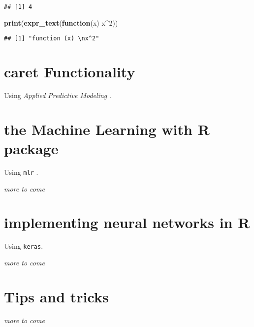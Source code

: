 \documentclass[]{book}
\newenvironment{Shaded}{\begin{snugshade}}{\end{snugshade}}
\newcommand{\KeywordTok}[1]{\textcolor[rgb]{0.13,0.29,0.53}{\textbf{#1}}}
\newcommand{\DecValTok}[1]{\textcolor[rgb]{0.00,0.00,0.81}{#1}}
\newcommand{\ControlFlowTok}[1]{\textcolor[rgb]{0.13,0.29,0.53}{\textbf{#1}}}
\newcommand{\OperatorTok}[1]{\textcolor[rgb]{0.81,0.36,0.00}{\textbf{#1}}}
\newcommand{\NormalTok}[1]{#1}
\begin{document}
\begin{verbatim}
## [1] 4
\end{verbatim}

\begin{Shaded}
\begin{Highlighting}[]
\KeywordTok{print}\NormalTok{(}\KeywordTok{expr_text}\NormalTok{(}\ControlFlowTok{function}\NormalTok{(x) x}\OperatorTok{^}\DecValTok{2}\NormalTok{))}
\end{Highlighting}
\end{Shaded}

\begin{verbatim}
## [1] "function (x) \nx^2"
\end{verbatim}

\chapter{caret Functionality}\label{ch:caret}

Using \emph{Applied Predictive Modeling} \citep{kuhn2013applied}.

\chapter{the Machine Learning with R package}\label{ch:mlr}

Using \texttt{mlr} \citep{mlr}.

\emph{more to come}

\chapter{implementing neural networks in R}\label{ch:keras}

Using \texttt{keras}.

\emph{more to come}

\chapter{Tips and tricks}\label{ch:tips}

\emph{more to come}


\end{document}
